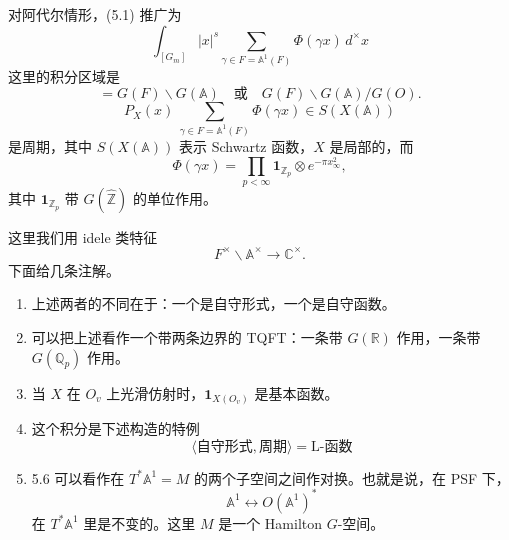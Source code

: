 对阿代尔情形，(5.1) 推广为
\begin{equation}
  \int_{[G_m]}|x|^s\sum_{\gamma\in F=\mathbb A^1(F)}\Phi(\gamma x)\,d^\times x
  \label{eq:5-9}
\end{equation}
这里的积分区域是
\begin{equation}
  [G_m]=G(F)\backslash G(\mathbb A)\quad\text{或}\quad G(F)\backslash G(\mathbb A)/G(O).
  \label{eq:5-10}
\end{equation}
\begin{equation}
  P_X(x)\ \sum_{\gamma\in F=\mathbb A^1(F)}\Phi(\gamma x)\in S(X(\mathbb A))
  \label{eq:5-11}
\end{equation}
是周期，其中 $S(X(\mathbb A))$ 表示 Schwartz 函数，$X$ 是局部的，而
\begin{equation}
  \Phi(\gamma x)=\prod_{p<\infty}\mathbf 1_{\mathbb Z_p}\otimes e^{-\pi x^2_\infty},
  \label{eq:5-12}
\end{equation}
其中 $\mathbf 1_{\mathbb Z_p}$ 带 $G(\hat{\mathbb Z})$ 的单位作用。

这里我们用 idele 类特征
\begin{equation}
  F^\times\backslash\mathbb A^\times\to\mathbb C^\times.
  \label{eq:5-13}
\end{equation}
下面给几条注解。

\begin{enumerate}[label=(\arabic*),leftmargin=2.0em,itemsep=0.25em]
  \item 上述两者的不同在于：一个是自守形式，一个是自守函数。
  \item 可以把上述看作一个带两条边界的 TQFT：一条带 $G(\mathbb R)$ 作用，一条带 $G(\mathbb Q_p)$ 作用。
  \item 当 $X$ 在 $O_v$ 上光滑仿射时，$\mathbf 1_{X(O_v)}$ 是基本函数。
  \item 这个积分是下述构造的特例
  \begin{equation}
    \langle\text{自守形式},\text{周期}\rangle=\text{L-函数}
    \label{eq:5-14}
  \end{equation}
  \item 5.6 可以看作在 $T^*\mathbb A^1=M$ 的两个子空间之间作对换。也就是说，在 PSF 下，
  \begin{equation}
    \mathbb A^1\longleftrightarrow O(\mathbb A^1)^*
    \label{eq:5-15}
  \end{equation}
  在 $T^*\mathbb A^1$ 里是不变的。这里 $M$ 是一个 Hamilton $G$-空间。
\end{enumerate}

